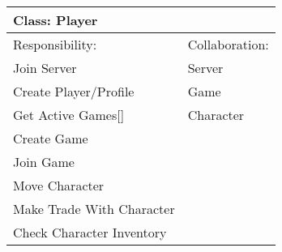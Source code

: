 \vspace{0.4cm}
\begin{tabular}{|p{7cm}|p{7cm}|} \hline
\multicolumn{2}{|l|}{Class:  Player} \\ \hline
Responsibility:  & Collaboration:  \\ \hline
 Join Server &  Server \\ 
 Create Player/Profile &  Game \\ 
 Get Active Games[] &  Character \\ 
 Create Game &   \\ 
 Join Game &   \\ 
 Move Character &   \\ 
 Make Trade With Character &   \\ 
 Check Character Inventory &   \\ 
\hline
\end{tabular}
\vspace{0.8cm}
